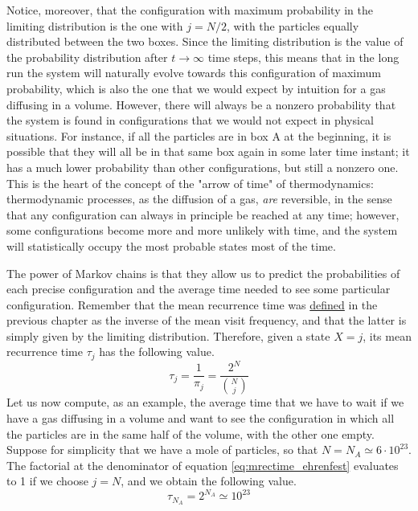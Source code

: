 Notice, moreover, that the configuration with maximum probability in the limiting distribution is the one with $j = N/2$, \ie with the particles equally distributed between the two boxes. Since the limiting distribution is the value of the probability distribution after $t\rightarrow \infty$ time steps, this means that in the long run the system will naturally evolve towards this configuration of maximum probability, which is also the one that we would expect by intuition for a gas diffusing in a volume. However, there will always be a nonzero probability that the system is found in configurations that we would not expect in physical situations. For instance, if all the particles are in box A at the beginning, it is possible that they will all be in that same box again in some later time instant; it has a much lower probability than other configurations, but still a nonzero one. This is the heart of the concept of the "arrow of time" of thermodynamics: thermodynamic processes, as the diffusion of a gas, \emph{are} reversible, in the sense that any configuration can always in principle be reached at any time; however, some configurations become more and more unlikely with time, and the system will statistically occupy the most probable states most of the time. 

The power of Markov chains is that they allow us to predict the probabilities of each precise configuration and the average time needed to see some particular configuration. Remember that the mean recurrence time was \hyperref[def:mean_rec_time] {defined} in the previous chapter as the inverse of the mean visit frequency, and that the latter is simply given by the limiting distribution. Therefore, given a state $X = j$, its mean recurrence time $\tau_j$ has the following value.
\begin{equation} \label{eq:mrectime_ehrenfest}
    \tau_j = \frac{1}{\pi_j} = \frac{2^N}{{{N} \choose {j}}} 
\end{equation}
Let us now compute, as an example, the average time that we have to wait if we have a gas diffusing in a volume and want to see the configuration in which all the particles are in the same half of the volume, with the other one empty. Suppose for simplicity that we have a mole of particles, so that $N = N_A \simeq 6\cdot 10^{23}$. The factorial at the denominator of equation \ref{eq:mrectime_ehrenfest} evaluates to 1 if we choose $j = N$, and we obtain the following value.
\begin{equation}
    \tau_{N_A} = 2^{N_A} \simeq 10^{23}
\end{equation}